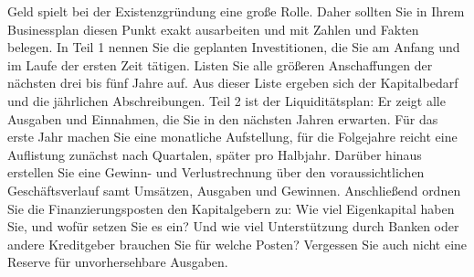 \documentclass[12pt, a4paper]{article} %
\begin{document}
Geld spielt bei der Existenzgründung eine große Rolle. Daher sollten Sie in Ihrem Businessplan diesen Punkt exakt ausarbeiten und mit Zahlen und Fakten belegen. In Teil 1 nennen Sie die geplanten Investitionen, die Sie am Anfang und im Laufe der ersten Zeit tätigen. Listen Sie alle größeren Anschaffungen der nächsten drei bis fünf Jahre auf. Aus dieser Liste ergeben sich der Kapitalbedarf und die jährlichen Abschreibungen. Teil 2 ist der Liquiditätsplan: Er zeigt alle Ausgaben und Einnahmen, die Sie in den nächsten Jahren erwarten. Für das erste Jahr machen Sie eine monatliche Aufstellung, für die Folgejahre reicht eine Auflistung zunächst nach Quartalen, später pro Halbjahr. Darüber hinaus erstellen Sie eine Gewinn- und Verlustrechnung über den voraussichtlichen Geschäftsverlauf samt Umsätzen, Ausgaben und Gewinnen. Anschließend ordnen Sie die Finanzierungsposten den Kapitalgebern zu: Wie viel Eigenkapital haben Sie, und wofür setzen Sie es ein? Und wie viel Unterstützung durch Banken oder andere Kreditgeber brauchen Sie für welche Posten? Vergessen Sie auch nicht eine Reserve für unvorhersehbare Ausgaben.



\newpage
\end{document}
